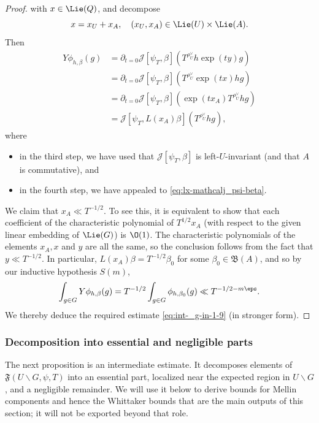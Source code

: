 \begin{proof}
  with $x \in \Lie(Q)$, and decompose
  \begin{equation*}
    x = x_U + x_A, \quad
    (x_U, x_A) \in \Lie(U)  \times \Lie(A).
  \end{equation*}
  Then
  \begin{align*}
    Y \phi_{h,\beta}(g)
    &= \partial_{t=0} \mathcal{J}[\psi_T,\beta](T^{\rho_U^\vee} h \exp(t y) g) \\
    &=
      \partial_{t=0} \mathcal{J}[\psi_T, \beta](T^{\rho_U^\vee} \exp(t x) h g)
    \\
    &=
      \partial_{t=0} \mathcal{J}[\psi_T, \beta](\exp(t x_A) T^{\rho_U^\vee} h g)
    \\
    &=
      \mathcal{J}[\psi_T, L(x_A) \beta](T^{\rho_U^\vee} h g),
  \end{align*}
  where
  \begin{itemize}
  \item in the third step, we have used that $\mathcal{J}[\psi_T,\beta]$ is left-$U$-invariant (and that $A$ is commutative), and
  \item in the fourth step, we have appealed to \eqref{eq:lx-mathcalj_psi-beta}.
  \end{itemize}
  We claim that $x_A \ll T^{-1/2}$.  To see this, it is equivalent to show that each coefficient of the characteristic polynomial of $T^{1/2} x_A$ (with respect to the given linear embedding of $\Lie(G)$) is $\O(1)$.  The characteristic polynomials of the elements $x_A, x$ and $y$ are all the same, so the conclusion follows from the fact that $y \ll T^{-1/2}$.  In particular, $L(x_A) \beta = T^{-1/2} \beta_0$ for some $\beta_0 \in \mathfrak{B}(A)$, and so by our inductive hypothesis $S(m)$,
  \begin{equation*}
    \int_{g \in G} Y \phi_{h,\beta}(g) =
    T^{-1/2}
    \int_{g \in G} \phi_{h,\beta_0}(g) \ll T^{-1/2 - m \eps}.
  \end{equation*}
  We thereby deduce the required estimate \eqref{eq:int-_g-in-1-9} (in stronger form).
\end{proof}

\subsubsection{Decomposition into essential and negligible parts}

The next proposition is an intermediate estimate.  It decomposes elements of $\mathfrak{F}(U \backslash G,\psi,T)$ into an essential part, localized near the expected region in $U \backslash G$, and a negligible remainder.  We will use it below to derive bounds for Mellin components and hence the Whittaker bounds that are the main outputs of this section; it will not be exported beyond that role.

